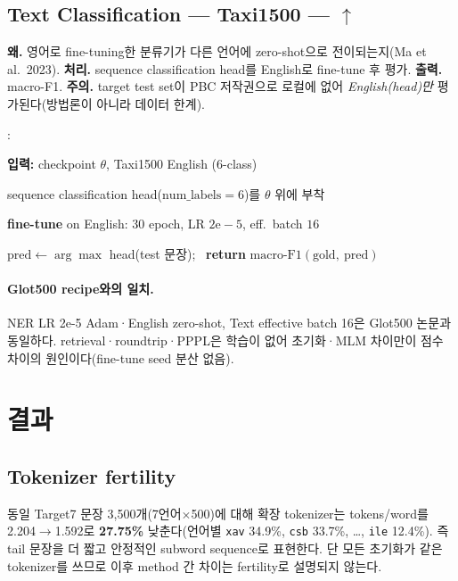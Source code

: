 \documentclass[11pt,a4paper]{article}
\newcounter{pcln}
\newenvironment{pcode}{%
  \begin{list}{\scriptsize\arabic{pcln}:}{%
    \usecounter{pcln}\small
    \setlength{\leftmargin}{2.2em}\setlength{\labelwidth}{1.6em}%
    \setlength{\itemsep}{1.5pt}\setlength{\parsep}{0pt}\setlength{\topsep}{3pt}}%
}{\end{list}}
\newcommand{\kw}[1]{\textbf{#1}}                       %
\newcommand{\up}{$\uparrow$}
\begin{document}
\subsection{Text Classification --- Taxi1500 --- \up}
\textbf{왜.} 영어로 fine-tuning한 분류기가 다른 언어에 zero-shot으로 전이되는지(Ma et al.\ 2023). \textbf{처리.} sequence classification head를 English로 fine-tune 후 평가. \textbf{출력.} macro-F1. \textbf{주의.} target test set이 PBC 저작권으로 로컬에 없어 \emph{English(head)만} 평가된다(방법론이 아니라 데이터 한계).
\begin{algorithm}[h]
\caption{Text Classification --- Taxi1500 (zero-shot)}
\begin{pcode}
\item \kw{입력:} checkpoint $\theta$, Taxi1500 English (6-class)
\item sequence classification head($\text{num\_labels}{=}6$)를 $\theta$ 위에 부착
\item \kw{fine-tune} on English: $30$ epoch, LR $2\mathrm{e}{-}5$, eff.\ batch $16$
\item $\text{pred} \gets \arg\max$ head(test 문장); \ \kw{return} $\mathrm{macro\text{-}F1}(\text{gold},\ \text{pred})$
\end{pcode}
\end{algorithm}

\paragraph{Glot500 recipe와의 일치.} NER LR 2e-5 Adam·English zero-shot, Text effective batch 16은 Glot500 논문과 동일하다. retrieval·roundtrip·PPPL은 학습이 없어 초기화·MLM 차이만이 점수 차이의 원인이다(fine-tune seed 분산 없음).

\section{결과}

\subsection{Tokenizer fertility}
동일 Target7 문장 3{,}500개(7언어$\times$500)에 대해 확장 tokenizer는 tokens/word를 2.204$\to$1.592로 \textbf{27.75\%} 낮춘다(언어별 \texttt{xav} 34.9\%, \texttt{csb} 33.7\%, \dots, \texttt{ile} 12.4\%). 즉 tail 문장을 더 짧고 안정적인 subword sequence로 표현한다. 단 모든 초기화가 같은 tokenizer를 쓰므로 이후 method 간 차이는 fertility로 설명되지 않는다.
\end{document}
